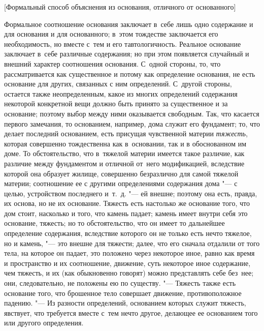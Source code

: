 %
{[Формальный способ объяснения из основания, отличного от основанного]}

Формальное соотношение основания заключает в~себе лишь одно содержание и для
основания и для основанного; в~этом тождестве заключается его необходимость,
но вместе с~тем и его тавтологичность. Реальное основание заключает в~себе
различные содержания; но при этом появляется случайный и внешний характер
соотношения основания. С~одной стороны, то, что рассматривается как
существенное и потому как определение основания, не есть основание для других,
связанных с ним определений. С~другой стороны, остается также неопределенным,
какое из многих определений содержания некоторой конкретной вещи должно быть
принято за существенное и за основание; поэтому выбор между ними оказывается
свободным. Так, что касается первого замечания, то основанием, например, дома
служит его фундамент; то, что делает последний основанием, есть присущая
чувственной материи {\em тяжесть}, которая совершенно тождественна как
в~основании, так и в обоснованном им доме. То обстоятельство, что в~тяжелой
материи имеется такое различие, как различие между фундаментом и отличной
от~него модификацией, вследствие которой она образует жилище, совершенно
безразлично для самой тяжелой материи; соотношение ее с другими определениями
содержания дома "--- с целью, устройством последнего и~т.~д. "--- ей внешне;
поэтому она есть, правда, их основа, но не их основание. Тяжесть есть настолько
же основание того, что дом стоит, насколько и того, что камень падает; камень
имеет внутри себя это основание, тяжесть; но то обстоятельство, что он имеет то
дальнейшее определение содержания, вследствие которого он не только есть нечто
тяжелое, но и камень, "--- это внешне для тяжести; далее, что его сначала
отдалили от того тела, на которое он падает, это положено через некоторое
иное, равно как время и пространство и их соотношение, движение, суть
некоторое иное содержание, чем тяжесть, и их (как обыкновенно говорят) можно
представлять себе без~нее; они, следовательно, не положены ею по существу. "---
Тяжесть также есть основание того, что брошенное тело совершает движение,
противоположное падению. "--- Из разности определений, основанием которых
служит тяжесть, явствует, что требуется вместе с~тем нечто другое, делающее
ее основанием того или другого определения.

